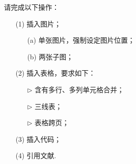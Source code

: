 \documentclass{assignment}
\begin{document}
    \begin{ti}
        请完成以下操作：
        \begin{itemize}
            \item[(1)] 插入图片；
            \begin{itemize}
                \item[(a)] 单张图片，强制设定图片位置；
                \item[(b)] 两张子图；
            \end{itemize}
            \item[(2)] 插入表格，要求如下：
            \begin{itemize}
                \item[$\triangleright$] 含有多行、多列单元格合并；
                \item[$\triangleright$] 三线表；
                \item[$\triangleright$] 表格跨页；
            \end{itemize}
            \item[(3)] 插入代码；
            \item[(4)] 引用文献.
        \end{itemize}
    \end{ti}
\end{document}
